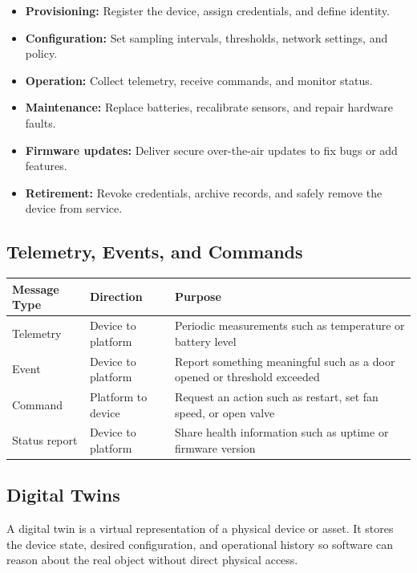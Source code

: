 \documentclass[11pt,a4paper]{article}
\begin{document}
\begin{itemize}[leftmargin=*]
  \item \textbf{Provisioning:} Register the device, assign credentials, and define identity.
  \item \textbf{Configuration:} Set sampling intervals, thresholds, network settings, and policy.
  \item \textbf{Operation:} Collect telemetry, receive commands, and monitor status.
  \item \textbf{Maintenance:} Replace batteries, recalibrate sensors, and repair hardware faults.
  \item \textbf{Firmware updates:} Deliver secure over-the-air updates to fix bugs or add features.
  \item \textbf{Retirement:} Revoke credentials, archive records, and safely remove the device from service.
\end{itemize}

\subsection{Telemetry, Events, and Commands}

\begin{longtable}{p{3.0cm}p{4.0cm}p{5.7cm}}
\toprule
\textbf{Message Type} & \textbf{Direction} & \textbf{Purpose} \\
\midrule
Telemetry & Device to platform & Periodic measurements such as temperature or battery level \\
Event & Device to platform & Report something meaningful such as a door opened or threshold exceeded \\
Command & Platform to device & Request an action such as restart, set fan speed, or open valve \\
Status report & Device to platform & Share health information such as uptime or firmware version \\
\bottomrule
\end{longtable}

\subsection{Digital Twins}

\begin{definitionbox}
A digital twin is a virtual representation of a physical device or asset. It stores the device state, desired configuration, and operational history so software can reason about the real object without direct physical access.
\end{definitionbox}
\end{document}
